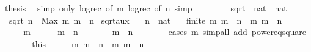\begin{isabellebody}
\ {\isacharquery}thesis\ \isamarkupfalse%
\ {\isacharparenleft}simp\ only{\isacharcolon}\ log{\isacharunderscore}rec\ {\isacharbrackleft}of\ m{\isacharbrackright}\ log{\isacharunderscore}rec\ {\isacharbrackleft}of\ n{\isacharbrackright}{\isacharparenright}\ simp\isanewline
\ \ \ \ \isamarkupfalse%
\isanewline
\ \ \isamarkupfalse%
\isanewline
{}\isamarkupfalse%
%
\endisatagproof
{\isafoldproof}%
%
\isadelimproof
%
\endisadelimproof
%
\isamarkuptrue%
\isamarkupfalse%
\ sqrt\ {\isacharcolon}{\isacharcolon}\ {\isachardoublequoteopen}nat\ {\isasymRightarrow}\ nat{\isachardoublequoteclose}\isanewline
{}\isanewline
\ \ {\isachardoublequoteopen}sqrt\ n\ {\isacharequal}\ Max\ {\isacharbraceleft}m{\isachardot}\ m\ {\isasymle}\ n{\isacharbraceright}{\isachardoublequoteclose}\isanewline
\isanewline
{}\isamarkupfalse%
\ sqrt{\isacharunderscore}aux{\isacharcolon}\isanewline
\ \ \ n\ {\isacharcolon}{\isacharcolon}\ nat\isanewline
\ \ \ {\isachardoublequoteopen}finite\ {\isacharbraceleft}m{\isachardot}\ m\ {\isasymle}\ n{\isacharbraceright}{\isachardoublequoteclose}\ \ {\isachardoublequoteopen}{\isacharbraceleft}m{\isachardot}\ m\ {\isasymle}\ n{\isacharbraceright}\ {\isasymnoteq}\ {\isacharbraceleft}{\isacharbraceright}{\isachardoublequoteclose}\isanewline
%
\isadelimproof
%
\endisadelimproof
%
\isatagproof
{}\isamarkupfalse%
\ {\isacharminus}\isanewline
\ \ \isacommand{{\isacharbraceleft}}\isamarkupfalse%
\ \isamarkupfalse%
\ m\isanewline
\ \ \ \ \isamarkupfalse%
\ {\isachardoublequoteopen}m\ {\isasymle}\ n{\isachardoublequoteclose}\isanewline
\ \ \ \ \isamarkupfalse%
\ \isamarkupfalse%
\ {\isachardoublequoteopen}m\ {\isasymle}\ n{\isachardoublequoteclose}\isanewline
\ \ \ \ \ \ \isamarkupfalse%
\ {\isacharparenleft}cases\ m{\isacharparenright}\ {\isacharparenleft}simp{\isacharunderscore}all\ add{\isacharcolon}\ power{}{\isacharunderscore}eq{\isacharunderscore}square{\isacharparenright}\isanewline
\ \ \isacommand{{\isacharbraceright}}\isamarkupfalse%
\ \isamarkupfalse%
\ {\isacharasterisk}{\isacharasterisk}\ {\isacharequal}\ this\isanewline
\ \ \isamarkupfalse%
\ \isamarkupfalse%
\ {\isachardoublequoteopen}{\isacharbraceleft}m{\isachardot}\ m\ {\isasymle}\ n{\isacharbraceright}\ {\isasymsubseteq}\ {\isacharbraceleft}m{\isachardot}\ m\ {\isasymle}\ n{\isacharbraceright}{\isachardoublequoteclose}\ \isamarkupfalse%

\end{isabellebody}
